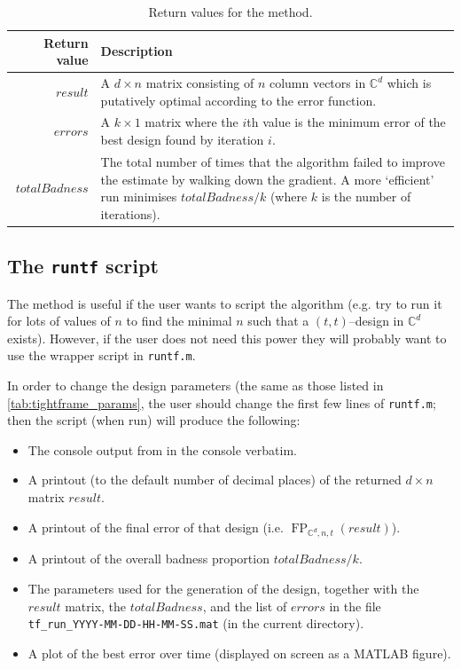 \documentclass{article}
\newcommand{\C}{\mathbb{C}}
\DeclareMathOperator{\FP}{FP}
\theoremstyle{definition}
\begin{document}
  \begin{table}
    \begin{threeparttable}
    \begin{tabularx}{\linewidth}{r|X}
      \textbf{Return value} & \textbf{Description} \\\hline
      $result$ & A $ d \times n $ matrix consisting of $ n $ column vectors in $ \C^d $ which is putatively optimal
                 according to the error function.\\
      $errors$ & A $ k \times 1 $ matrix where the $ i$th value is the minimum error of the best design found by
                 iteration $ i $.\\
      $totalBadness$ & The total number of times that the algorithm failed to improve the estimate by walking
                       down the gradient. A more `efficient' run minimises $ totalBadness/k $ (where $ k $ is the
                       number of iterations).
    \end{tabularx}
    \end{threeparttable}
    \caption{Return values for the  method.\label{tab:tightframe_returns}}
  \end{table}

  \subsection{The \texttt{runtf} script}
  The  method is useful if the user wants to script the algorithm (e.g. try to run it for
  lots of values of $ n $ to find the minimal $ n $ such that a $ (t,t)$--design in $ \C^d $ exists). However,
  if the user does not need this power they will probably want to use the wrapper script in \texttt{runtf.m}.

  In order to change the design parameters (the same as those listed in \cref{tab:tightframe_params}, the user
  should change the first few lines of \texttt{runtf.m}; then the script (when run) will produce the following:
  \begin{itemize}
    \item The console output from  in the console verbatim.
    \item A printout (to the default number of decimal places) of the returned $ d \times n $ matrix $ result $.
    \item A printout of the final error of that design (i.e. $ \FP_{\C^d,n,t}(result) $).
    \item A printout of the overall badness proportion $ totalBadness/k $.
    \item The parameters used for the generation of the design, together with the $ result $ matrix, the $ totalBadness $, and the list of $ errors $
          in the file \verb|tf_run_YYYY-MM-DD-HH-MM-SS.mat| (in the current directory).
    \item A plot of the best error over time (displayed on screen as a MATLAB figure).
  \end{itemize}
\end{document}
